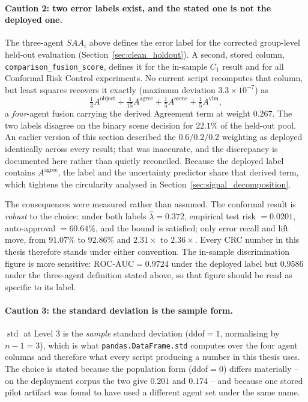 \documentclass[12pt,a4paper]{report}
\begin{document}
\paragraph{Caution 2: two error labels exist, and the stated one is not the deployed one.}
The three-agent $SAA_i$ above defines the error label for the corrected group-level held-out evaluation (Section~\ref{sec:clean_holdout}). A second, stored column, \texttt{comparison\_fusion\_score}, defines it for the in-sample $C_1$ result and for all Conformal Risk Control experiments. No current script recomputes that column, but least squares recovers it exactly (maximum deviation $3.3\times10^{-7}$) as
\begin{equation*}
    \tfrac{1}{3} A^{\text{object}} + \tfrac{4}{15} A^{\text{agree}} + \tfrac{1}{5} A^{\text{scene}} + \tfrac{1}{5} A^{\text{vlm}},
\end{equation*}
a \emph{four}-agent fusion carrying the derived Agreement term at weight $0.267$. The two labels disagree on the binary scene decision for $22.1\%$ of the held-out pool. An earlier version of this section described the $0.6/0.2/0.2$ weighting as deployed identically across every result; that was inaccurate, and the discrepancy is documented here rather than quietly reconciled. Because the deployed label contains $A^{\text{agree}}$, the label and the uncertainty predictor share that derived term, which tightens the circularity analysed in Section~\ref{sec:signal_decomposition}.

The consequences were measured rather than assumed. The conformal result is \emph{robust} to the choice: under both labels $\hat\lambda = 0.372$, empirical test risk $= 0.0201$, auto-approval $= 60.64\%$, and the bound is satisfied; only error recall and lift move, from $91.07\%$ to $92.86\%$ and $2.31\times$ to $2.36\times$. Every CRC number in this thesis therefore stands under either convention. The in-sample discrimination figure is more sensitive: $\text{ROC-AUC} = 0.9724$ under the deployed label but $0.9586$ under the three-agent definition stated above, so that figure should be read as specific to its label.

\paragraph{Caution 3: the standard deviation is the sample form.}
$\operatorname{std}$ at Level 3 is the \emph{sample} standard deviation (ddof$=1$, normalising by $n-1=3$), which is what \texttt{pandas.DataFrame.std} computes over the four agent columns and therefore what every script producing a number in this thesis uses. The choice is stated because the population form (ddof$=0$) differs materially -- on the deployment corpus the two give $0.201$ and $0.174$ -- and because one stored pilot artifact was found to have used a different agent set under the same name.
\end{document}
